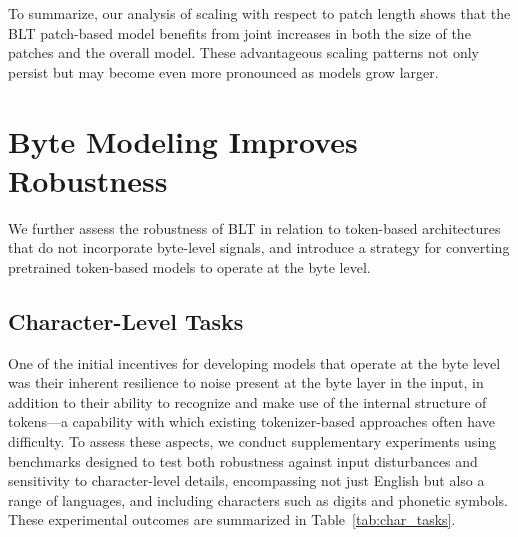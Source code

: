 To summarize, our analysis of scaling with respect to patch length shows that the {\textsc BLT} patch-based model benefits from joint increases in both the size of the patches and the overall model. These advantageous scaling patterns not only persist but may become even more pronounced as models grow larger.

\section{Byte Modeling Improves Robustness}
We further assess the robustness of {\textsc BLT} in relation to token-based architectures that do not incorporate byte-level signals, and introduce a strategy for converting pretrained token-based models to operate at the byte level.
\label{sec:robustness}

\subsection{Character-Level Tasks}

One of the initial incentives for developing models that operate at the byte level was their inherent resilience to noise present at the byte layer in the input, in addition to their ability to recognize and make use of the internal structure of tokens—a capability with which existing tokenizer-based approaches often have difficulty. To assess these aspects, we conduct supplementary experiments using benchmarks designed to test both robustness against input disturbances and sensitivity to character-level details, encompassing not just English but also a range of languages, and including characters such as digits and phonetic symbols. These experimental outcomes are summarized in Table~\ref{tab:char_tasks}.

